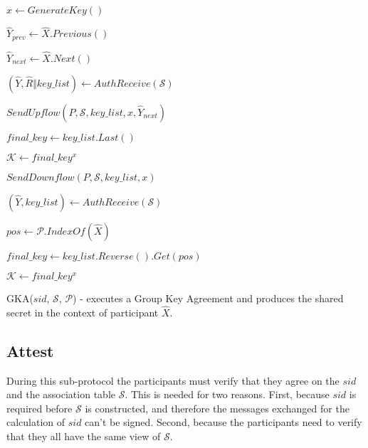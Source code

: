 \vfill
\begin{algorithm}[H]
  \Begin
  {
    $x \leftarrow GenerateKey()$

    $\hat{Y}_{prev} \leftarrow \hat{X}.Previous()$

    $\hat{Y}_{next} \leftarrow \hat{X}.Next()$   

    \Else
    {
      
      {
        $(\hat{Y}, \hat{R} \Vert key\_list) \leftarrow AuthReceive(\mathcal{S})$
      }

      {
      }
      {
        $SendUpflow(P, \mathcal{S}, key\_list, x, \hat{Y}_{next})$
      }
      \Else
      {
        $final\_key \leftarrow key\_list.Last()$

        $\mathcal{K} \leftarrow final\_key^x$

        $SendDownflow(P, \mathcal{S}, key\_list, x)$

      }
    }

    {
      $(\hat{Y}, key\_list) \leftarrow AuthReceive(\mathcal{S})$
    }
    {
    }
    
    $pos \leftarrow \mathcal{P}.IndexOf(\hat{X})$

    $final\_key \leftarrow key\_list.Reverse().Get(pos)$

    $\mathcal{K} \leftarrow final\_key^x$

  }
  \caption{GKA($sid$, $\mathcal{S}$, $\mathcal{P}$) - executes a Group Key Agreement and produces the shared secret in the context of participant $\hat{X}$.}
  \label{gka_proto_algo}
\end{algorithm}

\subsection{Attest}
\label{subsections:attest}
During this sub-protocol the participants must verify that they agree on the $sid$ and the association table $\mathcal{S}$. This is needed for two reasons. First, because $sid$ is required before $\mathcal{S}$ is constructed, and therefore the messages exchanged for the calculation of $sid$ can't be signed. Second, because the participants need to verify that they all have the same view of $\mathcal{S}$.

